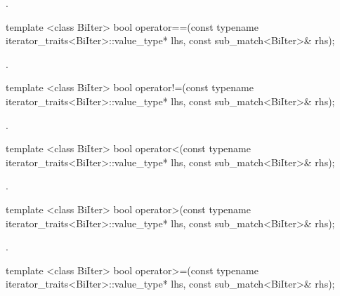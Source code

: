 \begin{itemdescr}
\pnum\returns {}.
\end{itemdescr}

%
\begin{itemdecl}
template <class BiIter>
  bool operator==(const typename iterator_traits<BiIter>::value_type* lhs,
                  const sub_match<BiIter>& rhs);
\end{itemdecl}

\begin{itemdescr}
\pnum\returns {}.
\end{itemdescr}

%
\begin{itemdecl}
template <class BiIter>
  bool operator!=(const typename iterator_traits<BiIter>::value_type* lhs,
                  const sub_match<BiIter>& rhs);
\end{itemdecl}

\begin{itemdescr}
\pnum\returns {}.
\end{itemdescr}

%
\begin{itemdecl}
template <class BiIter>
  bool operator<(const typename iterator_traits<BiIter>::value_type* lhs,
                 const sub_match<BiIter>& rhs);
\end{itemdecl}

\begin{itemdescr}
\pnum\returns {}.
\end{itemdescr}

%
\begin{itemdecl}
template <class BiIter>
  bool operator>(const typename iterator_traits<BiIter>::value_type* lhs,
                 const sub_match<BiIter>& rhs);
\end{itemdecl}

\begin{itemdescr}
\pnum\returns {}.
\end{itemdescr}

%
\begin{itemdecl}
template <class BiIter>
  bool operator>=(const typename iterator_traits<BiIter>::value_type* lhs,
                  const sub_match<BiIter>& rhs);
\end{itemdecl}


